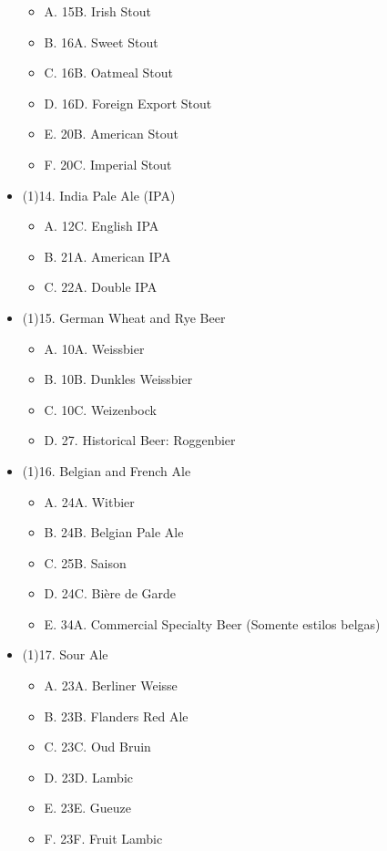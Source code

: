 \begin{multicols*}{2}
\begin{itemize}[noitemsep]
\begin{itemize}
  \item[] A. 15B. Irish Stout
  \item[] B. 16A. Sweet Stout
  \item[] C. 16B. Oatmeal Stout
  \item[] D. 16D. Foreign Export Stout
  \item[] E. 20B. American Stout
  \item[] F. 20C. Imperial Stout
\end{itemize}
\item[] (1)14. India Pale Ale (IPA)
\begin{itemize}
  \item[] A. 12C. English IPA
  \item[] B. 21A. American IPA
  \item[] C. 22A. Double IPA
\end{itemize}
\item[] (1)15. German Wheat and Rye Beer
\begin{itemize}
  \item[] A. 10A. Weissbier
  \item[] B. 10B. Dunkles Weissbier
  \item[] C. 10C. Weizenbock
  \item[] D. 27. Historical Beer: Roggenbier
\end{itemize}
\item[] (1)16. Belgian and French Ale
\begin{itemize}
  \item[] A. 24A. Witbier
  \item[] B. 24B. Belgian Pale Ale
  \item[] C. 25B. Saison
  \item[] D. 24C. Bière de Garde
  \item[] E. 34A. Commercial Specialty Beer (Somente estilos belgas)
\end{itemize}
\item[] (1)17. Sour Ale
\begin{itemize}
  \item[] A. 23A. Berliner Weisse
  \item[] B. 23B. Flanders Red Ale
  \item[] C. 23C. Oud Bruin
  \item[] D. 23D. Lambic
  \item[] E. 23E. Gueuze
  \item[] F. 23F. Fruit Lambic
\end{itemize}

\end{itemize}
\end{multicols*}

